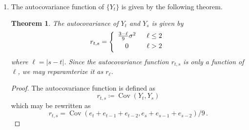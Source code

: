 \documentclass[10pt]{fphw}
\newtheorem{theorem}{Theorem}
\newcommand{\cov}{\operatorname{Cov}}
\begin{document}
\begin{enumerate}
\item The autocovariance function of $\{Y_t\}$ is given by the following theorem.
\begin{theorem}
The autocovariance of $Y_t$ and $Y_s$ is given by
\begin{align}
    r_{t,s} = \left\{
    \begin{array}{cc}
    \frac{3-\ell}{9}\sigma^2 & \vspace{1mm}\hspace{2mm} \ell \leq 2\\
    0                        & \vspace{1mm}\hspace{2mm} \ell > 2\\
    \end{array} \right.
\end{align}
where $\ell = |s-t|$.
Since the autocovariance function $r_{t,s}$ is only a function of $\ell$, we may reparamterize it as $r_\ell$.
\end{theorem}
\begin{proof}
The autocovariance function is defined as
\begin{equation*}
r_{t,s} \coloneqq \cov(Y_t,Y_s)
\end{equation*}
which may be rewritten as
\begin{equation*}
r_{t,s} = \cov(e_t + e_{t-1} + e_{t-2},e_s + e_{s-1} + e_{s-2})/9\,.
\end{equation*}


\end{proof}
\end{enumerate}
\end{document}
